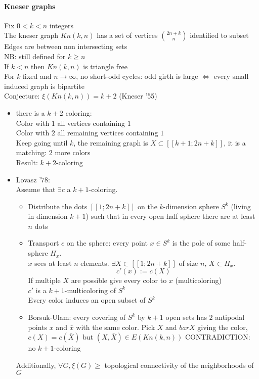 \documentclass[12pt]{article}
\begin{document}
\paragraph{Kneser graphs\\}
Fix $0 < k < n$ integers\\
The kneser graph $Kn(k,n)$ has a set of vertices $\binom{2n+k}{n}$ identified to subset\\
Edges are between non intersecting sets\\
NB: still defined for $k \geqslant n$\\
If $k < n$ then $Kn(k,n)$ is triangle free\\
For $k$ fixed and $n \rightarrow \infty$, no short-odd cycles: odd girth is large $\Leftrightarrow$ every small induced graph is bipartite\\
Conjecture: $\xi \left( Kn(k,n) \right) = k+2$ (Kneser '55)\\
\begin{itemize}
\item there is a $k+2$ coloring:\\
	Color with $1$ all vertices containing $1$\\
	Color with $2$ all remaining vertices containing $1$\\
	Keep going until $k$, the remaining graph is $X \subset [[ k+1; 2n+k]]$, it is a matching: $2$ more colors\\
	Result: $k+2$-coloring
\item Lovasz '78:\\
	Assume that $\exists c$ a $k+1$-coloring.
	\begin{itemize}
	\item Distribute the dots $[[1; 2n+k]]$ on the $k$-dimension sphere $S^k$ (living in dimension $k+1$) such that in every open half sphere there are at least $n$ dots
	\item Transport $c$ on the sphere: every point $x \in S^k$ is the pole of some half-sphere $H_x$.\\
		$x$ sees at least $n$ elements. $\exists X \subset [[1; 2n+k]]$ of size $n$, $X \subset H_x$.\\
		\[c'(x) := c(X)\]
		If multiple $X$ are possible give every color to $x$ (multicoloring)\\
		$c'$ is a $k+1$-multicoloring of $S^k$\\
		Every color induces an open subset of $S^k$\\
	\item Borsuk-Ulam: every covering of $S^k$ by $k+1$ open sets has $2$ antipodal points $x$ and $\bar{x}$ with the same color.
		Pick $X$ and $bar{X}$ giving the color, $c(X) = c(\bar{X})$ but $(X,\bar{X}) \in E \left( Kn(k,n) \right)$
		CONTRADICTION: no $k+1$-coloring
	\end{itemize}
	Additionally, $\forall G, \xi(G) \geqslant$ topological connectivity of the neighborhoods of $G$
\end{itemize}
\end{document}
